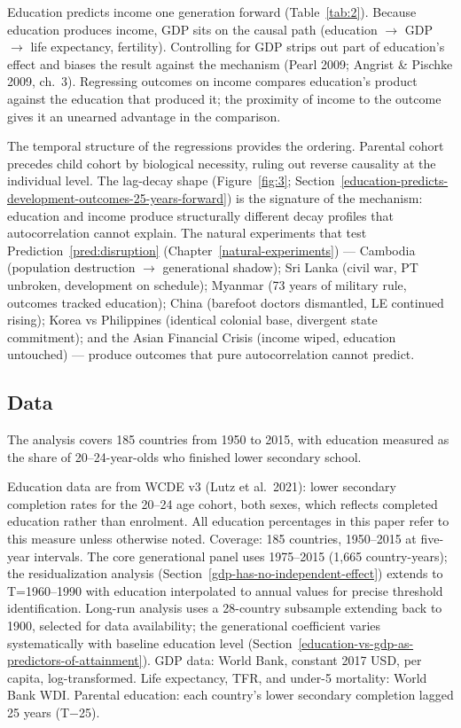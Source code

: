 \documentclass[12pt,letterpaper]{article}
\begin{document}
Education predicts income one generation forward (Table~\ref{tab:2}).
Because education produces income, GDP sits on the causal path
(education $\to$ GDP $\to$ life expectancy, fertility). Controlling for
GDP strips out part of education's effect and biases the result against
the mechanism (Pearl 2009; Angrist \& Pischke 2009, ch.~3). Regressing
outcomes on income compares education's product against the education
that produced it; the proximity of income to the outcome gives it an
unearned advantage in the comparison.

The temporal structure of the regressions provides the ordering.
Parental cohort precedes child cohort by biological necessity, ruling
out reverse causality at the individual level. The lag-decay shape
(Figure~\ref{fig:3};
Section~\ref{education-predicts-development-outcomes-25-years-forward})
is the signature of the mechanism: education and income produce
structurally different decay profiles that autocorrelation cannot
explain. The natural experiments that test
Prediction~\ref{pred:disruption} (Chapter~\ref{natural-experiments}) ---
Cambodia (population destruction $\to$ generational shadow); Sri Lanka
(civil war, PT unbroken, development on schedule); Myanmar (73 years of
military rule, outcomes tracked education); China (barefoot doctors
dismantled, LE continued rising); Korea vs Philippines (identical
colonial base, divergent state commitment); and the Asian Financial
Crisis (income wiped, education untouched) --- produce outcomes that
pure autocorrelation cannot predict.

\subsection{Data}\label{data}

The analysis covers 185 countries from 1950 to 2015, with education measured as the share of 20--24-year-olds who finished lower secondary school.

Education data are from WCDE v3 (Lutz et al.~2021): lower secondary
completion rates for the 20--24 age cohort, both sexes, which reflects
completed education rather than enrolment. All education percentages in
this paper refer to this measure unless otherwise noted. Coverage: 185
countries, 1950--2015 at five-year intervals.
The core generational
panel uses 1975--2015 (1,665 country-years); the residualization
analysis (Section~\ref{gdp-has-no-independent-effect}) extends to T=1960--1990 with education
interpolated to annual values for precise threshold identification.
Long-run analysis uses a 28-country subsample extending back to 1900,
selected for data availability; the generational coefficient varies
systematically with baseline education level (Section~\ref{education-vs-gdp-as-predictors-of-attainment}). GDP data:
World Bank, constant 2017 USD, per capita, log-transformed. Life
expectancy, TFR, and under-5 mortality: World Bank WDI. Parental
education: each country's lower secondary completion lagged 25 years
(T−25).
\end{document}

